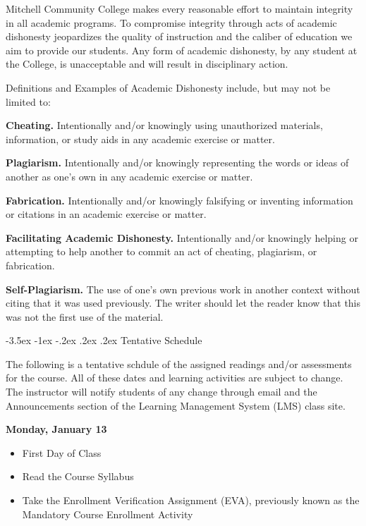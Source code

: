 \documentclass[11pt]{article}
\makeatletter
\renewcommand\section{\@startsection{section}{1}{0pt}%
  {-3.5ex \@plus -1ex \@minus -.2ex}%
  {.2ex \@plus.2ex}%
  {\normalfont\Large\bfseries}} %
\makeatother
\begin{document}
Mitchell Community College makes every reasonable effort to maintain integrity in all academic programs. To compromise integrity through acts of academic dishonesty jeopardizes the quality of instruction and the caliber of education we aim to provide our students.  Any form of academic dishonesty, by any student at the College, is unacceptable and will result in disciplinary action.

Definitions and Examples of Academic Dishonesty include, but may not be limited to:

\textbf{Cheating.} Intentionally and/or knowingly using unauthorized materials, information, or study aids in any academic exercise or matter.

\textbf{Plagiarism.} Intentionally and/or knowingly representing the words or ideas of another as one's own in any academic exercise or matter.

\textbf{Fabrication.} Intentionally and/or knowingly falsifying or inventing information or citations in an academic exercise or matter.

\textbf{Facilitating Academic Dishonesty.} Intentionally and/or knowingly helping or attempting to help another to commit an act of cheating, plagiarism, or fabrication.

\textbf{Self-Plagiarism.} The use of one's own previous work in another context without citing that it was used previously. The writer should let the reader know that this was not the first use of the material.

\pagebreak
\section{Tentative Schedule}

The following is a tentative schdule of the assigned readings and/or assessments for the course. All of these dates and learning activities are subject to change. The instructor will notify students of any change through email and the Announcements section of the Learning Management System (LMS) class site.

\textbf{Monday, January 13}

\begin{itemize}
\item First Day of Class
\item Read the Course Syllabus
\item Take the Enrollment Verification Assignment (EVA), previously known as the Mandatory Course Enrollment Activity
\end{itemize}
\end{document}
